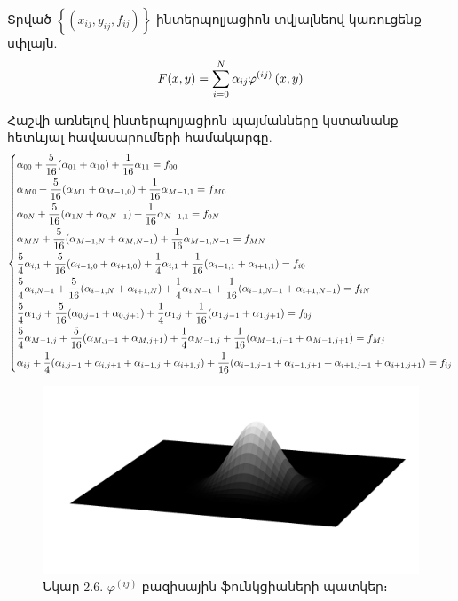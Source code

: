 \documentclass[fleqn, bachelor,subf,12pt,notitlepage]{article}
\begin{document}
Տրված $\left\{\left(x_{ij}, y_{ij}, f_{ij}\right)\right\}$ ինտերպոլյացիոն տվյալնեով կառուցենք սփլայն.
\begin{equation}
F(x,y) = \sum_{i=0}^{N} \alpha_{ij}\varphi^{(ij)}\left(x, y\right)$$
\end{equation}

Հաշվի առնելով ինտերպոլյացիոն պայմանները կստանանք հետևյալ հավասարումերի համակարգը.
\begin{equation}
\begin{dcases}
\alpha_{00}+\frac{5}{16}(\alpha_{01} + \alpha_{10}) +\frac{1}{16}\alpha_{11} = f_{00}\\
\alpha_{M0}+\frac{5}{16}(\alpha_{M1} + \alpha_{M-1,0}) +\frac{1}{16}\alpha_{M-1, 1} = f_{M0}\\
\alpha_{0N}+\frac{5}{16}(\alpha_{1N} + \alpha_{0,N-1}) +\frac{1}{16}\alpha_{N-1, 1} = f_{0N}\\
\alpha_{MN}+\frac{5}{16}(\alpha_{M-1,N} + \alpha_{M,N-1}) +\frac{1}{16}\alpha_{M-1,N-1} = f_{MN}\\
\frac{5}{4}\alpha_{i,1}+\frac{5}{16}(\alpha_{i-1,0} + \alpha_{i+1,0}) +\frac{1}{4}\alpha_{i,1} + \frac{1}{16}(\alpha_{i-1,1}+\alpha_{i+1,1}) = f_{i0}\\
\frac{5}{4}\alpha_{i,N-1}+\frac{5}{16}(\alpha_{i-1,N} + \alpha_{i+1,N}) +\frac{1}{4}\alpha_{i,N-1} + \frac{1}{16}(\alpha_{i-1,N-1}+\alpha_{i+1,N-1}) = f_{iN}\\
\frac{5}{4}\alpha_{1,j}+\frac{5}{16}(\alpha_{0,j-1} + \alpha_{0,j+1}) +\frac{1}{4}\alpha_{1,j} + \frac{1}{16}(\alpha_{1,j-1}+\alpha_{1,j+1}) = f_{0j}\\
\frac{5}{4}\alpha_{M-1,j}+\frac{5}{16}(\alpha_{M,j-1} + \alpha_{M,j+1}) +\frac{1}{4}\alpha_{M-1,j} + \frac{1}{16}(\alpha_{M-1,j-1}+\alpha_{M-1,j+1}) = f_{Mj}\\
\alpha_{ij} + \frac{1}{4}(\alpha_{i,j-1} + \alpha_{i,j+1} + \alpha_{i-1,j} + \alpha_{i+1,j}) + \frac{1}{16}(\alpha_{i-1,j-1} + \alpha_{i-1,j+1} + \alpha_{i+1,j-1} +\alpha_{i+1,j+1}) = f_{ij}
\end{dcases}
\end{equation}
\newpage
\begin{figure}[h!]
\centering
\includegraphics[width=1.0\textwidth]{images/two_dimensional_basis}
\captionsetup{labelformat=empty}
\caption{Նկար 2.6. $\varphi^{(ij)}$ բազիսային ֆունկցիաների պատկեր։}
\end{figure}
\end{document}

